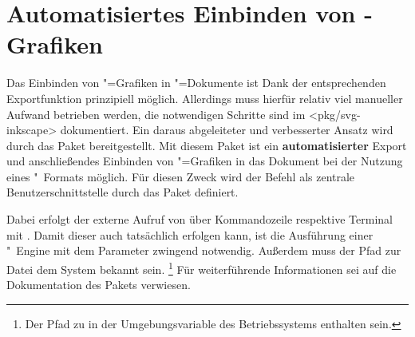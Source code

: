 \section{%
  Automatisiertes Einbinden von -Grafiken%
}
%
%
Das Einbinden von "=Grafiken in "=Dokumente
ist Dank der entsprechenden Exportfunktion prinzipiell möglich. Allerdings muss 
hierfür relativ viel manueller Aufwand betrieben werden, die notwendigen 
Schritte sind im \CTAN<pkg/svg-inkscape> dokumentiert. Ein daraus abgeleiteter 
und verbesserter Ansatz wird durch das Paket  bereitgestellt. Mit 
diesem Paket ist ein \textbf{automatisierter} Export und anschließendes 
Einbinden von "=Grafiken in das Dokument bei der Nutzung 
eines "~Formats möglich. Für diesen Zweck wird der Befehl
als zentrale Benutzerschnittstelle durch das Paket definiert.

Dabei erfolgt der externe Aufruf von  über Kommandozeile 
respektive Terminal mit . Damit dieser auch tatsächlich 
erfolgen kann, ist die Ausführung einer "~Engine mit dem 
Parameter  zwingend notwendig. Außerdem muss der 
Pfad zur Datei  dem System bekannt sein.%
\footnote{%
  Der Pfad zu  in der Umgebungsvariable  des 
  Betriebssystems enthalten sein.%
}
Für weiterführende Informationen sei auf die Dokumentation des Pakets 
 verwiesen.



